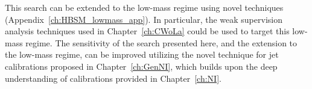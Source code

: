This search can be extended to the low-mass regime using novel techniques (Appendix~\ref{ch:HBSM_lowmass_app}).
In particular, the weak supervision analysis techniques used in Chapter~\ref{ch:CWoLa} could be used to target this low-mass regime.
The sensitivity of the search presented here, and the extension to the low-mass regime, can be improved utilizing the novel technique for jet calibrations proposed in Chapter~\ref{ch:GenNI}, which builds upon the deep understanding of calibrations provided in Chapter~\ref{ch:NI}.
